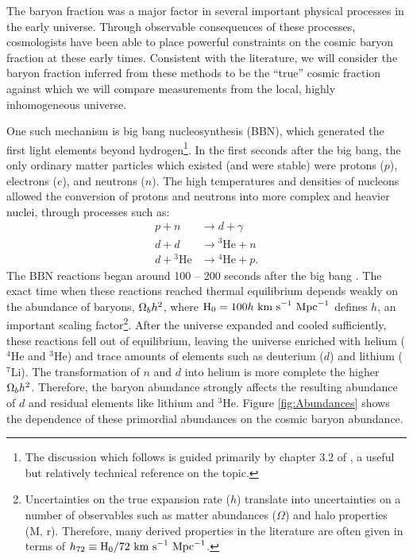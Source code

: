 The baryon fraction was a major factor in several important physical
processes in the early universe. Through observable consequences of
these processes, cosmologists have been able to place powerful
constraints on the cosmic baryon fraction at these early
times. Consistent with the literature, we will consider the baryon
fraction inferred from these methods to be the ``true'' cosmic
fraction against which we will compare measurements from the local,
highly inhomogeneous universe.

One such mechanism is big bang nucleosynthesis (BBN), which generated
the first light elements beyond hydrogen\footnote{The discussion which
  follows is guided primarily by chapter 3.2 of \citet{Weinberg2008},
  a useful but relatively technical reference on the topic.}. In the
first seconds after the big bang, the only ordinary matter particles
which existed (and were stable) were protons ($p$), electrons
($e$), and neutrons ($n$). The high temperatures and densities of
nucleons allowed the conversion of protons and neutrons into more
complex and heavier nuclei, through processes such as:
\begin{align}
p + n &\rightarrow{} d + \gamma \nonumber \\
d + d &\rightarrow{} ^3\textrm{He} + n \nonumber \\
d +{} ^3\textrm{He} &\rightarrow{} ^4\textrm{He} + p .\nonumber
\end{align}
The BBN reactions began around 100 -- 200 seconds after the big bang
\citep{Weinberg2008}. The exact time when these reactions reached
thermal equilibrium depends weakly on the abundance of baryons,
$\Omega_b h^2$, where $\textrm{H\ensuremath{_0}} = 100h~\textrm{km~s}^{-1}~\textrm{Mpc}^{-1}$ defines $h$, an important
scaling factor\footnote{Uncertainties on the true expansion rate ($h$)
  translate into uncertainties on a number of observables such as
  matter abundances ($\Omega$) and halo properties (M, r). Therefore,
  many derived properties in the literature are often given in terms
  of $h_{72} \equiv{} \textrm{H\ensuremath{_0}} / 72~\textrm{km~s}^{-1}~\textrm{Mpc}^{-1}$.}. After the universe expanded
and cooled sufficiently, these reactions fell out of equilibrium,
leaving the universe enriched with helium ($^4$He and $^3$He) and
trace amounts of elements such as deuterium ($d$) and lithium
($^7$Li). The transformation of $n$ and $d$ into helium is more
complete the higher $\Omega_b h^2$. Therefore, the baryon abundance
strongly affects the resulting abundance of $d$ and residual elements
like lithium and $^3$He. Figure \ref{fig:Abundances} shows the
dependence of these primordial abundances on the cosmic baryon
abundance.

